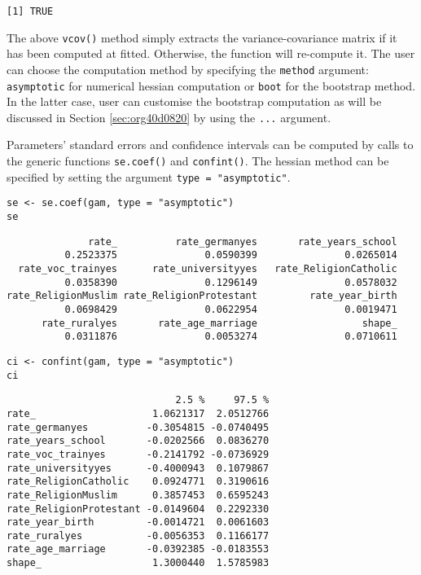 \documentclass[a4paper,twoside,11pt]{article}
\begin{document}
\begin{verbatim}
[1] TRUE
\end{verbatim}

The above \texttt{vcov()} method simply extracts the variance-covariance matrix if it
has been computed at fitted. Otherwise, the function will re-compute it. The
user can choose the computation method by specifying the \texttt{method} argument:
\texttt{asymptotic} for numerical hessian computation or \texttt{boot} for the bootstrap
method. In the latter case, user can customise the bootstrap computation as will
be discussed in Section \ref{sec:org40d0820} by using the \texttt{...} argument.

Parameters' standard errors and confidence intervals can be computed by calls to
the generic functions \texttt{se.coef()} and \texttt{confint()}. The hessian method can be
specified by setting the argument \texttt{type = "asymptotic"}.

\begin{verbatim}
se <- se.coef(gam, type = "asymptotic")
se
\end{verbatim}

\begin{verbatim}
              rate_          rate_germanyes       rate_years_school 
          0.2523375               0.0590399               0.0265014 
  rate_voc_trainyes      rate_universityyes   rate_ReligionCatholic 
          0.0358390               0.1296149               0.0578032 
rate_ReligionMuslim rate_ReligionProtestant         rate_year_birth 
          0.0698429               0.0622954               0.0019471 
      rate_ruralyes       rate_age_marriage                  shape_ 
          0.0311876               0.0053274               0.0710611
\end{verbatim}

\begin{verbatim}
ci <- confint(gam, type = "asymptotic")
ci
\end{verbatim}

\begin{verbatim}
                             2.5 %     97.5 %
rate_                    1.0621317  2.0512766
rate_germanyes          -0.3054815 -0.0740495
rate_years_school       -0.0202566  0.0836270
rate_voc_trainyes       -0.2141792 -0.0736929
rate_universityyes      -0.4000943  0.1079867
rate_ReligionCatholic    0.0924771  0.3190616
rate_ReligionMuslim      0.3857453  0.6595243
rate_ReligionProtestant -0.0149604  0.2292330
rate_year_birth         -0.0014721  0.0061603
rate_ruralyes           -0.0056353  0.1166177
rate_age_marriage       -0.0392385 -0.0183553
shape_                   1.3000440  1.5785983
\end{verbatim}
\end{document}
